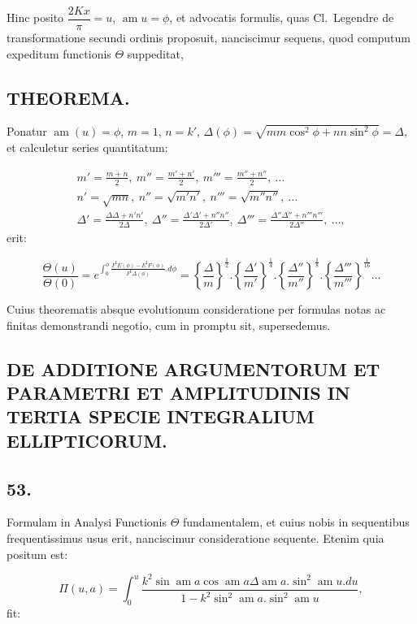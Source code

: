 \documentclass{article}
\begin{document}
Hinc posito $\dfrac{2Kx}{\pi}=u$, $\operatorname{am}u=\phi$, et advocatis formulis, quas Cl.\ Legendre de transformatione secundi ordinis proposuit, nanciscimur sequens, quod computum expeditum functionis $\Theta$ suppeditat,

\subsection*{THEOREMA.}

Ponatur $\operatorname{am}(u)=\phi$, $m=1$, $n=k'$, $\Delta(\phi)=\sqrt{mm\cos^{2}\phi+nn\sin^{2}\phi}=\Delta$, et calculetur series quantitatum:

\[
\begin{gathered}
m'=\frac{m+n}{2},\ m''=\frac{m'+n'}{2},\ m'''=\frac{m''+n''}{2},\ \ldots\\[1.5ex]
n'=\sqrt{mn},\ n''=\sqrt{m'n'},\ n'''=\sqrt{m''n''},\ \ldots\\[1.5ex]
\Delta'=\frac{\Delta\Delta+n'n'}{2\Delta},\ \Delta''=\frac{\Delta'\Delta'+n''n''}{2\Delta'},\ \Delta'''=\frac{\Delta''\Delta''+n'''n'''}{2\Delta''},\ \ldots,
\end{gathered}
\]
erit:

\[
\frac{\Theta(u)}{\Theta(0)}=e^{\int_{0}^{\phi}\frac{F^{\mathrm{I}}E(\phi)-E^{\mathrm{I}}F(\phi)}{F^{\mathrm{I}}\Delta(\phi)}.d\phi}=\left\{\frac{\Delta}{m}\right\}^{\frac{1}{2}}.\left\{\frac{\Delta'}{m'}\right\}^{\frac{1}{4}}.\left\{\frac{\Delta''}{m''}\right\}^{\frac{1}{8}}.\left\{\frac{\Delta'''}{m'''}\right\}^{\frac{1}{16}}\ldots
\]

Cuius theorematis absque evolutionum consideratione per formulas notas ac finitas demonstrandi negotio, cum in promptu sit, supersedemus.

\subsection*{DE ADDITIONE ARGUMENTORUM ET PARAMETRI ET AMPLITUDINIS IN TERTIA SPECIE INTEGRALIUM ELLIPTICORUM.}

\subsection*{53.}

Formulam in Analysi Functionis $\Theta$ fundamentalem, et cuius nobis in sequentibus frequentissimus usus erit, nanciscimur consideratione sequente. Etenim quia positum est:

\[
\Pi(u,a)=\int_{0}^{u}\frac{k^{2}\sin\operatorname{am}a\cos\operatorname{am}a\Delta\operatorname{am}a.\sin^{2}\operatorname{am}u.du}{1-k^{2}\sin^{2}\operatorname{am}a.\sin^{2}\operatorname{am}u},
\]
fit:
\end{document}

